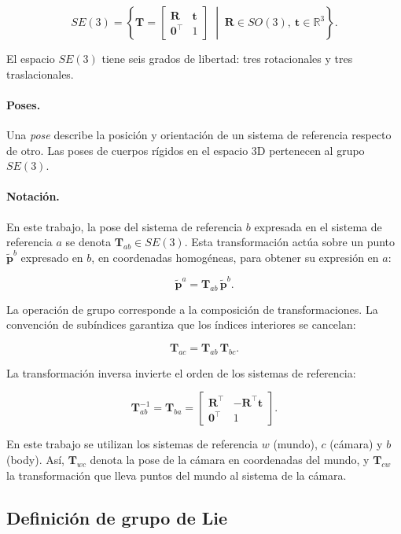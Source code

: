 \[
SE(3) = \left\{ \mathbf{T} = \begin{bmatrix} \mathbf{R} & \mathbf{t} \\ \mathbf{0}^\top & 1 \end{bmatrix} \;\middle|\; \mathbf{R}\in SO(3),\ \mathbf{t}\in\mathbb{R}^3 \right\}.
\]

El espacio $SE(3)$ tiene seis grados de libertad: tres rotacionales y tres traslacionales.

\paragraph{Poses.}
Una \textit{pose} describe la posición y orientación de un sistema de referencia respecto de otro. Las poses de cuerpos rígidos en el espacio 3D pertenecen al grupo $SE(3)$.

\paragraph{Notación.}
En este trabajo, la pose del sistema de referencia $b$ expresada en el sistema de referencia $a$ se denota $\mathbf{T}_{ab} \in SE(3)$. Esta transformación actúa sobre un punto $\tilde{\mathbf{p}}^b$ expresado en $b$, en coordenadas homogéneas, para obtener su expresión en $a$:

\[
\tilde{\mathbf{p}}^a = \mathbf{T}_{ab}\,\tilde{\mathbf{p}}^b.
\]

La operación de grupo corresponde a la composición de transformaciones. La convención de subíndices garantiza que los índices interiores se cancelan:

\[
\mathbf{T}_{ac} = \mathbf{T}_{ab}\,\mathbf{T}_{bc}.
\]

La transformación inversa invierte el orden de los sistemas de referencia:

\[
\mathbf{T}_{ab}^{-1} = \mathbf{T}_{ba} =
\begin{bmatrix}
\mathbf{R}^\top & -\mathbf{R}^\top\mathbf{t}\\
\mathbf{0}^\top & 1
\end{bmatrix}.
\]

En este trabajo se utilizan los sistemas de referencia $w$ (mundo), $c$ (cámara) y $b$ (body). Así, $\mathbf{T}_{wc}$ denota la pose de la cámara en coordenadas del mundo, y $\mathbf{T}_{cw}$ la transformación que lleva puntos del mundo al sistema de la cámara.

\subsection{Definición de grupo de Lie}

